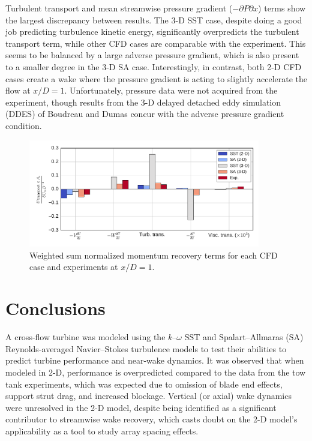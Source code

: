 \documentclass[aip,graphicx]{revtex4-1}
\begin{document}
Turbulent transport and mean streamwise pressure gradient ($-\partial P \partial
x$) terms show the largest discrepancy between results. The 3-D SST case,
despite doing a good job predicting turbulence kinetic energy, significantly
overpredicts the turbulent transport term, while other CFD cases are comparable
with the experiment. This seems to be balanced by a large adverse pressure
gradient, which is also present to a smaller degree in the 3-D SA case.
Interestingly, in contrast, both 2-D CFD cases create a wake where the pressure
gradient is acting to slightly accelerate the flow at $x/D=1$. Unfortunately,
pressure data were not acquired from the experiment, though results from the 3-D
delayed detached eddy simulation (DDES) of Boudreau and Dumas
\cite{Boudreau2015} concur with the adverse pressure gradient condition.

\begin{figure}
    \centering

    \includegraphics[width=0.9\textwidth]{mom_bar_graph}

    \caption{Weighted sum normalized momentum recovery terms for each CFD case
        and experiments\cite{Bachant2016-RVAT-Re-dep} at $x/D=1$.}

    \label{fig:br-cfd-recovery}
\end{figure}


\section{Conclusions}

A cross-flow turbine was modeled using the $k$--$\omega$ SST and
Spalart--Allmaras (SA) Reynolds-averaged Navier--Stokes turbulence models to
test their abilities to predict turbine performance and near-wake dynamics. It
was observed that when modeled in 2-D, performance is overpredicted compared to
the data from the tow tank experiments, which was expected due to omission of
blade end effects, support strut drag, and increased blockage. Vertical (or
axial) wake dynamics were unresolved in the 2-D model, despite being identified
as a significant contributor to streamwise wake recovery, which casts doubt on
the 2-D model's applicability as a tool to study array spacing effects.
\end{document}
